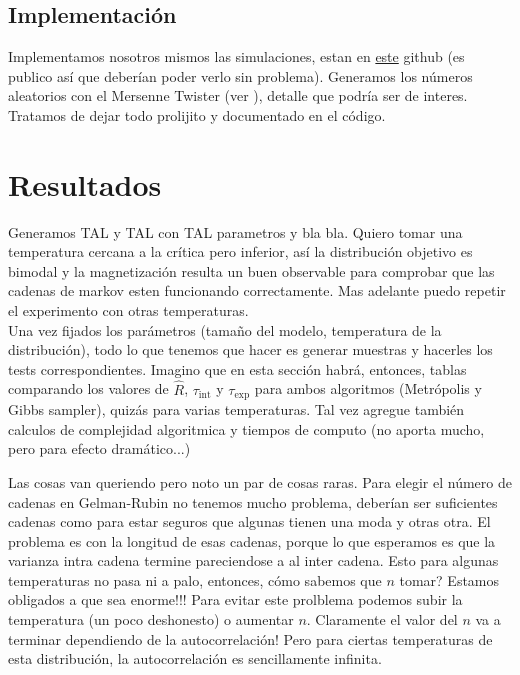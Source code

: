 \documentclass[a4paper, 12pt]{article}
\newcommand{\tauint}{\tau_\text{int}}
\newcommand{\tauexp}{\tau_\text{exp}}
\begin{document}
\subsection{Implementación}

Implementamos nosotros mismos las simulaciones, estan en \href{https://github.com/santigiordani/fiscomp-final.git}{este} github (es publico así que deberían poder verlo sin problema). Generamos los números aleatorios con el Mersenne Twister (ver \cite{matsumoto1998mersenne}), detalle que podría ser de interes. Tratamos de dejar todo prolijito y documentado en el código.

\section{Resultados}

Generamos TAL y TAL con TAL parametros y bla bla. Quiero tomar una temperatura cercana a la crítica pero inferior, así la distribución objetivo es bimodal y la magnetización resulta un buen observable para comprobar que las cadenas de markov esten funcionando correctamente. Mas adelante puedo repetir el experimento con otras temperaturas.\\

Una vez fijados los parámetros (tamaño del modelo, temperatura de la distribución), todo lo que tenemos que hacer es generar muestras y hacerles los tests correspondientes. Imagino que en esta sección habrá, entonces, tablas comparando los valores de $\hat{R}$, $\tauint$ y $\tauexp$ para ambos algoritmos (Metrópolis y Gibbs sampler), quizás para varias temperaturas. Tal vez agregue también calculos de complejidad algoritmica y tiempos de computo (no aporta mucho, pero para efecto dramático...)

Las cosas van queriendo pero noto un par de cosas raras. Para elegir el número de cadenas en Gelman-Rubin no tenemos mucho problema, deberían ser suficientes cadenas como para estar seguros que algunas tienen una moda y otras otra. El problema es con la longitud de esas cadenas, porque lo que esperamos es que la varianza intra cadena termine pareciendose a al inter cadena. Esto para algunas temperaturas no pasa ni a palo, entonces, cómo sabemos que $n$ tomar? Estamos obligados a que sea enorme!!! Para evitar este prolblema podemos subir la temperatura (un poco deshonesto) o aumentar $n$. Claramente el valor del $n$ va a terminar dependiendo de la autocorrelación! Pero para ciertas temperaturas de esta distribución, la autocorrelación es sencillamente infinita.
\end{document}

